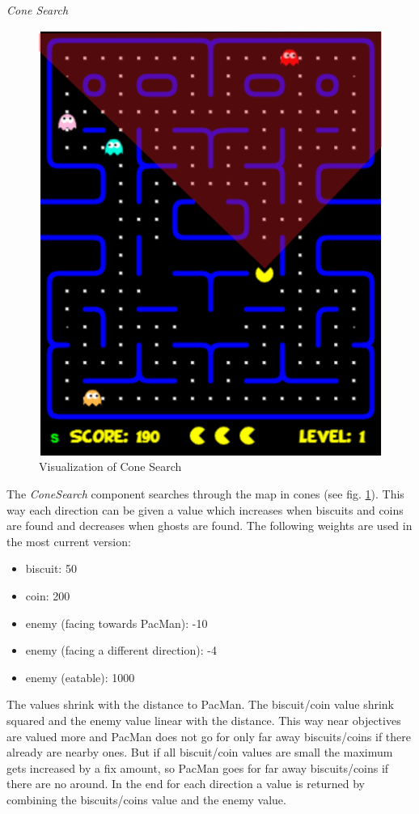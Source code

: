 \emph{Cone Search} \newline
\begin{figure}
	\label{fig:cone}
	\centering
	\includegraphics[scale=0.65]{pictures/PacMan/Cone.png}
	\caption{Visualization of Cone Search}
\end{figure}
The \textit{ConeSearch} component searches through the map in cones (see fig. \ref{fig:cone}). This way each direction can be given a value which increases when biscuits and coins are found and decreases when ghosts are found. The following weights are used in the most current version:
\begin{itemize}
	\item biscuit: 50
	\item coin: 200
	\item enemy (facing towards PacMan): -10
	\item enemy (facing a different direction): -4
	\item enemy (eatable): 1000
\end{itemize}
The values shrink with the distance to PacMan. The biscuit/coin value shrink squared and the enemy value linear with the distance. This way near objectives are valued more and PacMan does not go for only far away biscuits/coins if there already are nearby ones. But if all biscuit/coin values are small the maximum gets increased by a fix amount, so PacMan goes for far away biscuits/coins if there are no around. In the end for each direction a value is returned by combining the biscuits/coins value and the enemy value. 
